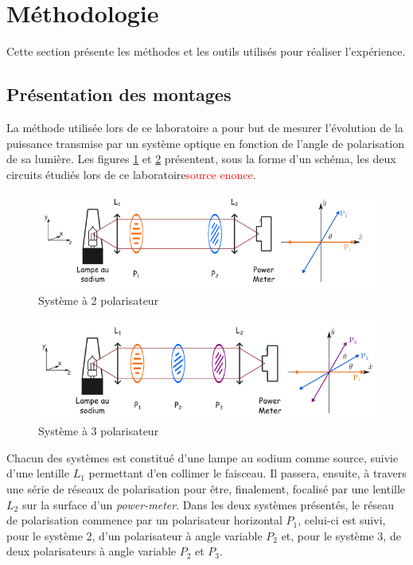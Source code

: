 \documentclass[11pt,letterpaper]{article}
\begin{document}

\section{Méthodologie}
Cette section présente les méthodes et les outils utilisés pour réaliser l'expérience.

\subsection{Présentation des montages}

La méthode utilisée lors de ce laboratoire a pour but de mesurer l'évolution de la puissance transmise par un système optique en fonction de l'angle de polarisation de sa lumière. Les figures \ref{systeme a 2 polarisateur} et \ref{systeme a 3 polarisateur} présentent, sous la forme d'un schéma, les deux circuits étudiés lors de ce laboratoire\textcolor{red}{source enonce}.


\begin{figure}[H]
  \centering
        \includegraphics[scale=0.71]{Systeme2polarisateurs.png}
        \caption{Système à 2 polarisateur}
        \label{systeme a 2 polarisateur}
\end{figure}

\begin{figure}[H]
  \centering
        \includegraphics[scale=0.71]{Systeme3polarisateurs.png}
        \caption{Système à 3 polarisateur}
        \label{systeme a 3 polarisateur}
\end{figure}

Chacun des systèmes est constitué d'une lampe au sodium comme source, suivie d'une lentille $L_1$ permettant d'en collimer le faisceau. Il passera, ensuite, à travers une série de réseaux de polarisation pour être, finalement, focalisé par une lentille $L_2$ sur la surface d'un \textit{power-meter}. Dans les deux systèmes présentés, le réseau de polarisation commence par un polarisateur horizontal $P_1$, celui-ci est suivi, pour le système 2, d'un polarisateur à angle variable $P_2$  et, pour le système 3, de deux polarisateurs à angle variable $P_2$ et $P_3$.
\end{document}
